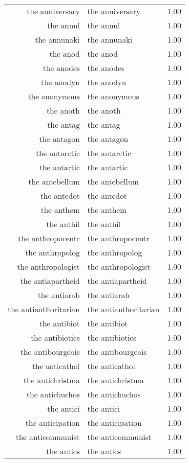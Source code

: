 \begin{table}[ht]
\begin{tabular}{rlr}
  the anniversary & the anniversary & 1.00 \\ 
  the annul & the annul & 1.00 \\ 
  the annunaki & the annunaki & 1.00 \\ 
  the anod & the anod & 1.00 \\ 
  the anodes & the anodes & 1.00 \\ 
  the anodyn & the anodyn & 1.00 \\ 
  the anonymous & the anonymous & 1.00 \\ 
  the anoth & the anoth & 1.00 \\ 
  the antag & the antag & 1.00 \\ 
  the antagon & the antagon & 1.00 \\ 
  the antarctic & the antarctic & 1.00 \\ 
  the antartic & the antartic & 1.00 \\ 
  the antebellum & the antebellum & 1.00 \\ 
  the antedot & the antedot & 1.00 \\ 
  the anthem & the anthem & 1.00 \\ 
  the anthil & the anthil & 1.00 \\ 
  the anthropocentr & the anthropocentr & 1.00 \\ 
  the anthropolog & the anthropolog & 1.00 \\ 
  the anthropologist & the anthropologist & 1.00 \\ 
  the antiapartheid & the antiapartheid & 1.00 \\ 
  the antiarab & the antiarab & 1.00 \\ 
  the antiauthoritarian & the antiauthoritarian & 1.00 \\ 
  the antibiot & the antibiot & 1.00 \\ 
  the antibiotics & the antibiotics & 1.00 \\ 
  the antibourgeois & the antibourgeois & 1.00 \\ 
  the anticathol & the anticathol & 1.00 \\ 
  the antichristma & the antichristma & 1.00 \\ 
  the antichuchos & the antichuchos & 1.00 \\ 
  the antici & the antici & 1.00 \\ 
  the anticipation & the anticipation & 1.00 \\ 
  the anticommunist & the anticommunist & 1.00 \\ 
  the antics & the antics & 1.00 \\ 

\end{tabular}
\end{table}
